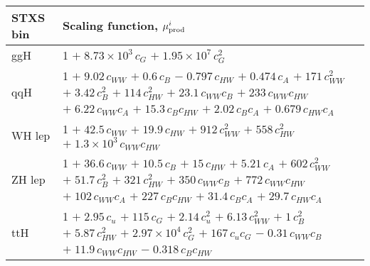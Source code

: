 \begin{tabular}{l|p{}}
    STXS bin & Scaling function, $\mu^i_{\rm{prod}}$ \\ \hline
    ggH & 1 $+\;8.73\times 10^{3}\,c_{G}$ $+\;1.95\times 10^{7}\,c_{G}^{2}$ \\
    qqH & 1 $+\;9.02\,c_{WW}$ $+\;0.6\,c_{B}$ $-\;0.797\,c_{HW}$ $+\;0.474\,c_{A}$ $+\;171\,c_{WW}^{2}$ $+\;3.42\,c_{B}^{2}$ $+\;114\,c_{HW}^{2}$ $+\;23.1\,c_{WW}c_{B}$ $+\;233\,c_{WW}c_{HW}$ $+\;6.22\,c_{WW}c_{A}$ $+\;15.3\,c_{B}c_{HW}$ $+\;2.02\,c_{B}c_{A}$ $+\;0.679\,c_{HW}c_{A}$ \\
    WH lep & 1 $+\;42.5\,c_{WW}$ $+\;19.9\,c_{HW}$ $+\;912\,c_{WW}^{2}$ $+\;558\,c_{HW}^{2}$ $+\;1.3\times 10^{3}\,c_{WW}c_{HW}$ \\
    ZH lep & 1 $+\;36.6\,c_{WW}$ $+\;10.5\,c_{B}$ $+\;15\,c_{HW}$ $+\;5.21\,c_{A}$ $+\;602\,c_{WW}^{2}$ $+\;51.7\,c_{B}^{2}$ $+\;321\,c_{HW}^{2}$ $+\;350\,c_{WW}c_{B}$ $+\;772\,c_{WW}c_{HW}$ $+\;102\,c_{WW}c_{A}$ $+\;227\,c_{B}c_{HW}$ $+\;31.4\,c_{B}c_{A}$ $+\;29.7\,c_{HW}c_{A}$ \\
    ttH & 1 $+\;2.95\,c_{u}$ $+\;115\,c_{G}$ $+\;2.14\,c_{u}^{2}$ $+\;6.13\,c_{WW}^{2}$ $+\;1\,c_{B}^{2}$ $+\;5.87\,c_{HW}^{2}$ $+\;2.97\times 10^{4}\,c_{G}^{2}$ $+\;167\,c_{u}c_{G}$ $-\;0.31\,c_{WW}c_{B}$ $+\;11.9\,c_{WW}c_{HW}$ $-\;0.318\,c_{B}c_{HW}$ \\
\end{tabular}